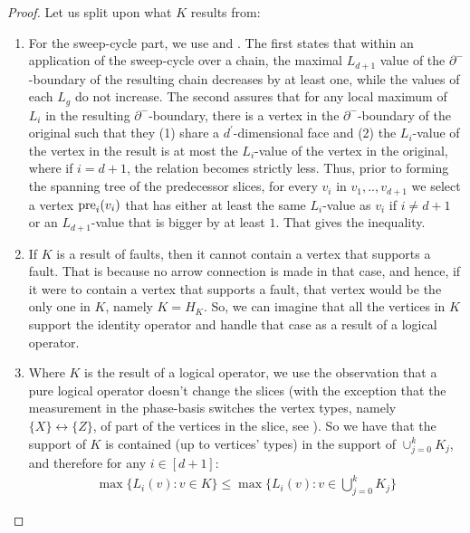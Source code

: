  \begin{proof}
 Let us split upon what $K$ results from:
    \begin{enumerate}
      \item For the sweep-cycle part, we use  and . The first states that within an application of the sweep-cycle over a chain, the maximal $L_{d+1}$ value of the $\partial^{-}$-boundary of the resulting chain decreases by at least one, while the values of each $L_{g}$ do not increase. The second assures that for any local maximum of $L_{i}$ in the resulting $\partial^{-}$-boundary, there is a vertex in the $\partial^{-}$-boundary of the original such that they (1) share a $d^{\prime}$-dimensional face and (2) the $L_{i}$-value of the vertex in the result is at most the $L_{i}$-value of the vertex in the original, where if $i=d+1$, the relation becomes strictly less. Thus, prior to forming the spanning tree of the predecessor slices, for every $v_{i}$ in $v_{1},..,v_{d+1}$ we select a vertex $\text{pre}_{i}(v_{i})$ that has either at least the same $L_{i}$-value as $v_{i}$ if $i\neq d+1$ or an $L_{d+1}$-value that is bigger by at least $1$. That gives the inequality.
        
      \item If $K$ is a result of faults, then it cannot contain a vertex that supports a fault. That is because no arrow connection is made in that case, and hence, if it were to contain a vertex that supports a fault, that vertex would be the only one in $K$, namely $K = H_{K}$. So, we can imagine that all the vertices in $K$ support the identity operator and handle that case as a result of a logical operator.
      \item Where $K$ is the result of a logical operator, we use the observation that a pure logical operator doesn't change the slices (with the exception that the measurement in the phase-basis switches the vertex types, namely $\{X\} \leftrightarrow \{Z\}$, of part of the vertices in the slice, see ). So we have that the support of $K$ is contained (up to vertices' types) in the support of $\cup_{j=0}^{k} K_{j}$, and therefore for any $i \in [d+1]$:
        \begin{equation*}
          \begin{split}
            \max \bigl\{ L_{i}(v) : v \in K \bigr\} \le \max \bigl\{ L_{i}(v) : v \in \bigcup_{j=0}^{k}K_{j} \bigr\} 
          \end{split}
        \end{equation*}
    \end{enumerate}
  \end{proof}

